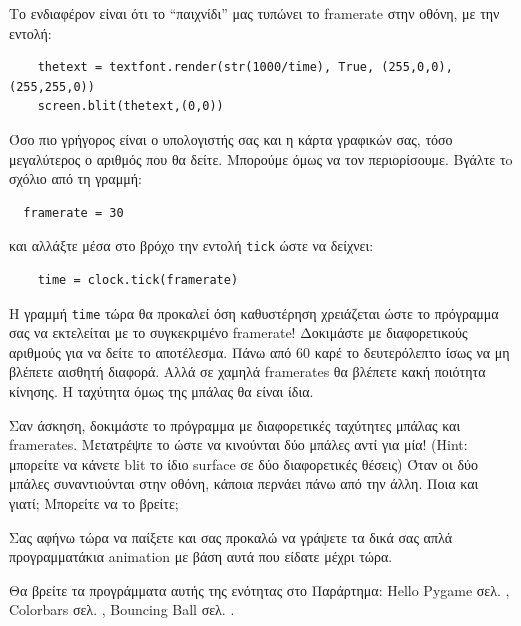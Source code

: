 Το ενδιαφέρον είναι ότι το ``παιχνίδι'' μας τυπώνει το framerate στην οθόνη, με την εντολή:

\begin{verbatim}
    thetext = textfont.render(str(1000/time), True, (255,0,0),(255,255,0))
    screen.blit(thetext,(0,0))
\end{verbatim}

Όσο πιο γρήγορος είναι ο υπολογιστής σας και η κάρτα γραφικών σας, τόσο μεγαλύτερος ο αριθμός που θα δείτε. Μπορούμε όμως να τον περιορίσουμε. Βγάλτε τo σχόλιο από τη γραμμή:

\begin{verbatim}
  framerate = 30
\end{verbatim}

και αλλάξτε μέσα στο βρόχο την εντολή {\tt tick} ώστε να δείχνει:

\begin{verbatim}
    time = clock.tick(framerate)
\end{verbatim}

Η γραμμή {\tt time} τώρα θα προκαλεί όση καθυστέρηση χρειάζεται ώστε το πρόγραμμα σας να εκτελείται με το συγκεκριμένο framerate! Δοκιμάστε με διαφορετικούς αριθμούς για να δείτε το αποτέλεσμα. Πάνω από 60 καρέ το δευτερόλεπτο ίσως να μη βλέπετε αισθητή διαφορά. Αλλά σε χαμηλά framerates θα βλέπετε κακή ποιότητα κίνησης. Η ταχύτητα όμως της μπάλας θα είναι ίδια.

Σαν άσκηση, δοκιμάστε το πρόγραμμα με διαφορετικές ταχύτητες μπάλας και framerates. Μετατρέψτε το ώστε να κινούνται δύο μπάλες αντί για μία! (Hint: μπορείτε να κάνετε blit το ίδιο surface σε δύο διαφορετικές θέσεις) Όταν οι δύο μπάλες συναντιούνται στην οθόνη, κάποια περνάει πάνω από την άλλη. Ποια και γιατί; Μπορείτε να το βρείτε;

Σας αφήνω τώρα να παίξετε και σας προκαλώ να γράψετε τα δικά σας απλά προγραμματάκια animation με βάση αυτά που είδατε μέχρι τώρα.

Θα βρείτε τα προγράμματα αυτής της ενότητας στο Παράρτημα: Hello Pygame σελ. \pageref{listing:hello-pygame}, Colorbars σελ. \pageref{listing:colorbars}, Bouncing Ball σελ. \pageref{listing:bouncing-ball}.
